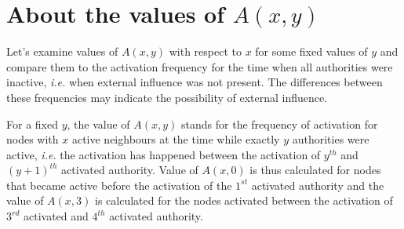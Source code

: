 \documentclass[times, utf8, zavrsni]{fer}
\begin{document}
\section{About the values of $A(x,y)$}
Let's examine values of $A(x,y)$ with respect to $x$ for some fixed values of $y$ and compare them to the activation frequency for the time when all authorities were  inactive, \emph{i.e.} when external influence was not present.  The differences between these frequencies may indicate the possibility of external influence. 

 For a fixed $y$, the value of $A(x,y)$ stands for the frequency of activation for nodes with $x$ active neighbours at the time while exactly $y$ authorities were active, \emph{i.e.} the activation has happened between the activation of $y^{th}$ and $(y+1)^{th}$  activated authority. Value of $A(x,0)$ is thus calculated for nodes that became active before the activation of the $1^{st}$ activated authority and the value of $A(x,3)$ is calculated for the nodes activated between the activation of $3^{rd}$ activated and $4^{th}$ activated authority.
\end{document}
